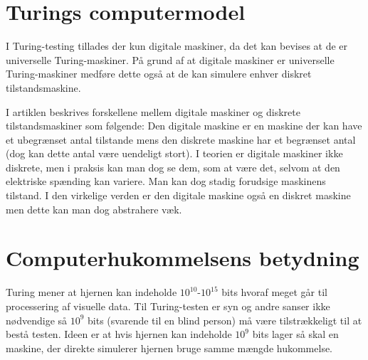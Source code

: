 \documentclass{article}
\author{Mikkel K. Mathiesen, Jannik Gram, Rune \& Rasmus Abrahams{\tt (son|en)}}
\title{}
\date{\today}
\begin{document}
\maketitle
\section{Turings computermodel}




I Turing-testing tillades der kun digitale maskiner, da det kan bevises at de er universelle Turing-maskiner. På grund af at digitale maskiner er universelle Turing-maskiner medføre dette også at de kan simulere enhver diskret tilstandsmaskine.

I artiklen beskrives forskellene mellem digitale maskiner og diskrete tilstandsmaskiner som følgende:
Den digitale maskine er en maskine der kan have et ubegrænset antal tilstande mens den diskrete maskine har et begrænset antal (dog kan dette antal være uendeligt stort). %
I teorien er digitale maskiner ikke diskrete, men i praksis kan man dog se dem, som at være det, selvom at den elektriske spænding kan variere. Man kan dog stadig forudsige maskinens tilstand.
I den virkelige verden er den digitale maskine også en diskret maskine men dette kan man dog abstrahere væk.

\section{Computerhukommelsens betydning}
Turing mener at hjernen kan indeholde $10^{10}$-$10^{15}$ bits hvoraf meget går til processering af visuelle data. Til Turing-testen er syn og andre sanser ikke nødvendige så  $10^9$ bits (svarende til en blind person) må være tilstrækkeligt til at bestå testen.
Ideen er at hvis hjernen kan indeholde $10^9$ bits lager så skal en maskine, der direkte simulerer hjernen bruge samme mængde hukommelse.
\end{document}
